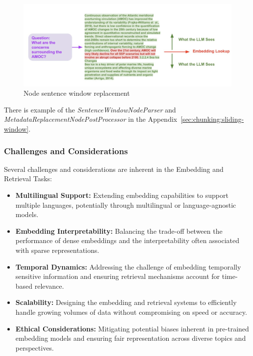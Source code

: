 \begin{figure}[ht!]
    \centering
    \begin{minipage}[b]{\textwidth}
        \centering
        \includegraphics[width=\textwidth]{res/window-ret}
        \caption{Node sentence window replacement~\cite{liu2023tweet}}
        \label{fig:window-ret}
    \end{minipage}
\end{figure}

There is example of the \textit{SentenceWindowNodeParser} and \textit{MetadataReplacementNodePostProcessor} in the Appendix~\ref{sec:chunking:sliding-window}.

\subsubsection{Challenges and Considerations}
Several challenges and considerations are inherent in the Embedding and Retrieval Tasks:
\begin{itemize}
    \item \textbf{Multilingual Support:} Extending embedding capabilities to support multiple languages, potentially through multilingual or language-agnostic models.
    \item \textbf{Embedding Interpretability:} Balancing the trade-off between the performance of dense embeddings and the interpretability often associated with sparse representations.
    \item \textbf{Temporal Dynamics:} Addressing the challenge of embedding temporally sensitive information and ensuring retrieval mechanisms account for time-based relevance.
    \item \textbf{Scalability:} Designing the embedding and retrieval systems to efficiently handle growing volumes of data without compromising on speed or accuracy.
    \item \textbf{Ethical Considerations:} Mitigating potential biases inherent in pre-trained embedding models and ensuring fair representation across diverse topics and perspectives.
\end{itemize}

